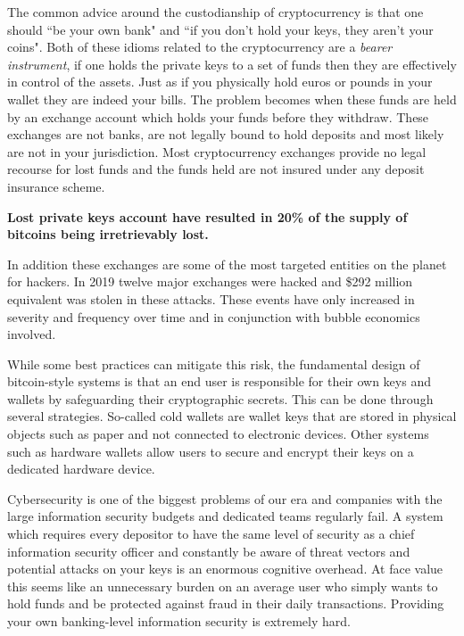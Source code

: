 The common advice around the custodianship of cryptocurrency is that one should
``be your own bank" and ``if you don't hold your keys, they aren't your
coins". Both of these idioms related to the cryptocurrency are a \textit{bearer
instrument}, if one holds the private keys to a set of funds then they are
effectively in control of the assets. Just as if you physically hold euros or
pounds in your wallet they are indeed your bills. The problem becomes when these
funds are held by an exchange account which holds your funds before they
withdraw. These exchanges are not banks, are not legally bound to hold deposits
and most likely are not in your jurisdiction. Most cryptocurrency exchanges
provide no legal recourse for lost funds and the funds held are not insured
under any deposit insurance scheme.

\begin{infobox}
 \textbf{Lost private keys account have resulted in 20\% of the supply of
  bitcoins being irretrievably lost.}
\end{infobox}

In addition these exchanges are some of the most targeted entities on the planet
for hackers. In 2019 twelve major exchanges were hacked and \$292 million
equivalent was stolen in these attacks. These events have only increased in
severity and frequency over time and in conjunction with bubble economics
involved.

While some best practices can mitigate this risk, the fundamental design
of bitcoin-style systems is that an end user is responsible for their
own keys and wallets by safeguarding their cryptographic secrets. This
can be done through several strategies. So-called cold wallets are
wallet keys that are stored in physical objects such as paper and not
connected to electronic devices. Other systems such as hardware wallets
allow users to secure and encrypt their keys on a dedicated hardware
device.

Cybersecurity is one of the biggest problems of our era and companies with the
large information security budgets and dedicated teams regularly fail. A system
which requires every depositor to have the same level of security as a chief
information security officer and constantly be aware of threat vectors and
potential attacks on your keys is an enormous cognitive overhead. At face value
this seems like an unnecessary burden on an average user who simply wants to
hold funds and be protected against fraud in their daily transactions. Providing
your own banking-level information security is extremely hard.

